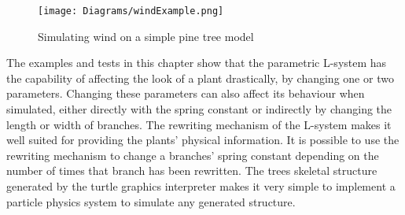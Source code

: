 \begin{figure}[htbp]
	{\centering
		\vspace{7px}
		\texttt{[image: Diagrams/windExample.png]}
		\label{3DAxisFigure} \label{Wind applied to generated model}
		\caption{Simulating wind on a simple pine tree model}
	}
\end{figure}
\FloatBarrier

\noindent
The examples and tests in this chapter show that the parametric L-system has the capability of affecting the look of a plant drastically, by changing one or two parameters. Changing these parameters can also affect its behaviour when simulated, either directly with the spring constant or indirectly by changing the length or width of branches. The rewriting mechanism of the L-system makes it well suited for providing the plants' physical information. It is possible to use the rewriting mechanism to change a branches' spring constant depending on the number of times that branch has been rewritten. The trees skeletal structure generated by the turtle graphics interpreter makes it very simple to implement a particle physics system to simulate any generated structure. 


